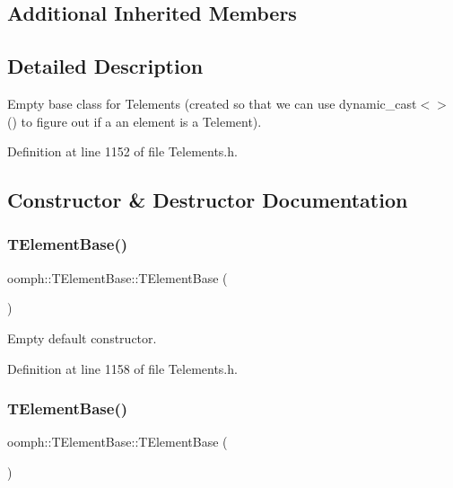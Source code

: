 \subsection*{Additional Inherited Members}


\subsection{Detailed Description}
Empty base class for Telements (created so that we can use dynamic\+\_\+cast$<$$>$() to figure out if a an element is a Telement). 

Definition at line 1152 of file Telements.\+h.



\subsection{Constructor \& Destructor Documentation}
\mbox{\label{classoomph_1_1TElementBase_a22cb91376d755b08c248acbc4f721422}} 
\subsubsection{\texorpdfstring{T\+Element\+Base()}{TElementBase()}\hspace{0.1cm}{\footnotesize\ttfamily [1/2]}}
{\footnotesize\ttfamily oomph\+::\+T\+Element\+Base\+::\+T\+Element\+Base (\begin{DoxyParamCaption}{ }\end{DoxyParamCaption})\hspace{0.3cm}{\ttfamily [inline]}}



Empty default constructor. 



Definition at line 1158 of file Telements.\+h.

\mbox{\label{classoomph_1_1TElementBase_a54043fafbe745fa7726f8c4132ea29f0}} 
\subsubsection{\texorpdfstring{T\+Element\+Base()}{TElementBase()}\hspace{0.1cm}{\footnotesize\ttfamily [2/2]}}
{\footnotesize\ttfamily oomph\+::\+T\+Element\+Base\+::\+T\+Element\+Base (\begin{DoxyParamCaption}\item[{const \hyperlink{classoomph_1_1TElementBase}{T\+Element\+Base} \&}]{ }\end{DoxyParamCaption})\hspace{0.3cm}{\ttfamily [inline]}}



